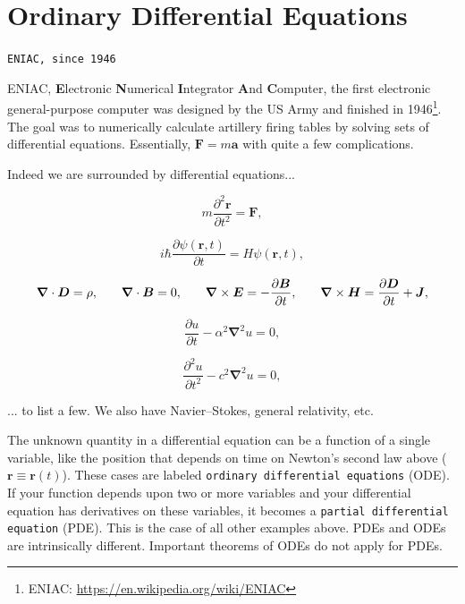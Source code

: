 \chapter{Ordinary Differential Equations}

\vspace*{-1cm}
\begin{flushright}
\texttt{ENIAC, since 1946}
\end{flushright}

\lettrine[nindent=0.35em,lhang=0.40,loversize=0.3]{E}{NIAC}, \textbf{E}lectronic \textbf{N}umerical \textbf{I}ntegrator \textbf{A}nd \textbf{C}omputer\cite{haigh2016eniac},
the first electronic general-purpose computer was designed by the US Army and finished in 1946\footnote{ENIAC: \url{https://en.wikipedia.org/wiki/ENIAC}}. The goal was to numerically calculate artillery firing tables by solving sets of differential equations. Essentially, $\bm{F} = m\bm{a}$ with quite a few complications.

Indeed we are surrounded by differential equations...

\begin{equation}
 m \dfrac{\partial^2 \bm{r}}{\partial t^2} = \bm{F},
\end{equation}

\begin{equation}
 i\hbar \dfrac{\partial \psi(\bm{r},t)}{\partial t} = H \psi(\bm{r},t),
\end{equation}

\begin{equation}
 \begin{array}{c c c c}
  \bm{\nabla}\cdot\bm{D} = \rho, \quad & \bm{\nabla}\cdot\bm{B} = 0, \quad & \bm{\nabla}\times\bm{E} = -\dfrac{\partial \bm{B}}{\partial t}, \quad & \bm{\nabla}\times\bm{H} = \dfrac{\partial \bm{D}}{\partial t} + \bm{J},
 \end{array}
\end{equation}

\begin{equation}
 \dfrac{\partial u}{\partial t} -\alpha^2 \bm{\nabla}^2 u = 0,
\end{equation}

\begin{equation}
 \dfrac{\partial^2 u}{\partial t^2} - c^2 \bm{\nabla}^2 u = 0,
\end{equation}

... to list a few. We also have Navier–Stokes, general relativity, etc.

The unknown quantity in a differential equation can be a function of a single variable, like the position that depends on time on Newton's second law above ($\bm{r} \equiv \bm{r}(t)$). These cases are labeled \texttt{ordinary differential equations} (ODE). If your function depends upon two or more variables and your differential equation has derivatives on these variables, it becomes a \texttt{partial differential equation} (PDE). This is the case of all other examples above. PDEs and ODEs are intrinsically different. Important theorems of ODEs do not apply for PDEs.

